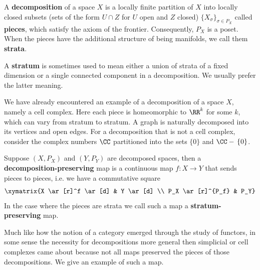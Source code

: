 \begin{defn}[Decomposition]
	A \textbf{decomposition} of a space $X$ is a locally finite partition of $X$ into locally closed subsets (sets of the form $U\cap Z$ for $U$ open and $Z$ closed) $\{X_{\sigma}\}_{\sigma\in P_X}$ called \textbf{pieces}, which satisfy the axiom of the frontier. Consequently, $P_X$ is a poset. When the pieces have the additional structure of being manifolds, we call them \textbf{strata}.
\end{defn}

\begin{rmk}
	A \textbf{stratum} is sometimes used to mean either a union of strata of a fixed dimension or a single connected component in a decomposition. We usually prefer the latter meaning.
\end{rmk}

We have already encountered an example of a decomposition of a space $X$, namely a cell complex. Here each piece is homeomorphic to $\RR^k$ for some $k$, which can vary from stratum to stratum. A graph is naturally decomposed into its vertices and open edges. For a decomposition that is not a cell complex, consider the complex numbers $\CC$ partitioned into the sets $\{0\}$ and $\CC-\,\{0\}$.

\begin{defn}
	Suppose $(X,P_X)$ and $(Y,P_Y)$ are decomposed spaces, then a \textbf{decomposition-preserving} map is a continuous map $f:X\to Y$ that sends pieces to pieces, i.e. we have a commutative square
	\[
	\xymatrix{X \ar[r]^f \ar[d] & Y \ar[d] \\ P_X \ar[r]^{P_f} & P_Y}
	\]
	In the case where the pieces are strata we call such a map a \textbf{stratum-preserving} map.
\end{defn}

Much like how the notion of a category emerged through the study of functors, in some sense the necessity for decompositions more general then simplicial or cell complexes came about because not all maps preserved the pieces of those decompositions. We give an example of such a map.

